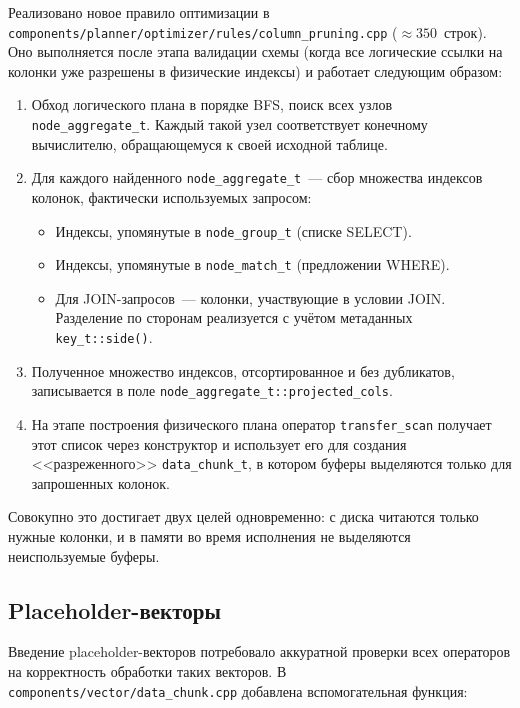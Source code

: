 Реализовано новое правило оптимизации в
\texttt{components/planner/optimizer/rules/column\_pruning.cpp}
($\approx 350$~строк). Оно выполняется после этапа валидации
схемы (когда все логические ссылки на колонки уже разрешены в
физические индексы) и работает следующим образом:

\begin{enumerate}
    \item Обход логического плана в порядке BFS, поиск всех узлов
    \texttt{node\_aggregate\_t}. Каждый такой узел соответствует
    конечному вычислителю, обращающемуся к своей исходной таблице.
    \item Для каждого найденного \texttt{node\_aggregate\_t}~---
    сбор множества индексов колонок, фактически используемых
    запросом:
    \begin{itemize}
        \item Индексы, упомянутые в \texttt{node\_group\_t}
        (списке SELECT).
        \item Индексы, упомянутые в \texttt{node\_match\_t}
        (предложении WHERE).
        \item Для JOIN-запросов~--- колонки, участвующие в условии
        JOIN. Разделение по сторонам реализуется с учётом
        метаданных \texttt{key\_t::side()}.
    \end{itemize}
    \item Полученное множество индексов, отсортированное и без
    дубликатов, записывается в поле
    \texttt{node\_aggregate\_t::projected\_cols}.
    \item На этапе построения физического плана оператор
    \texttt{transfer\_scan} получает этот список через конструктор
    и использует его для создания <<разреженного>>
    \texttt{data\_chunk\_t}, в котором буферы выделяются только
    для запрошенных колонок.
\end{enumerate}

Совокупно это достигает двух целей одновременно: с диска читаются
только нужные колонки, и в памяти во время исполнения не
выделяются неиспользуемые буферы.

\subsection{Placeholder-векторы}

Введение placeholder-векторов потребовало аккуратной проверки всех
операторов на корректность обработки таких векторов. В
\texttt{components/vector/data\_chunk.cpp} добавлена вспомогательная
функция:

